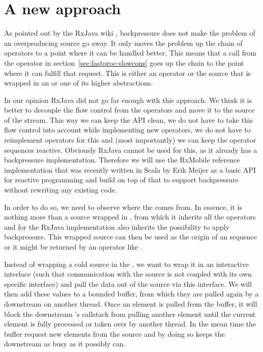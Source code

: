 \section{A new approach}
As pointed out by the RxJava wiki \cite{RxJava-Wiki-Backpressure}, backpressure does not make the problem of an overproducing source go away. It only moves the problem up the chain of operators to a point where it can be handled better. This means that a  call from the  operator in section~\ref{sec:fastproc-slowcons} goes up the chain to the point where it can fulfill that request. This is either an operator or the source that is wrapped in an  or one of its higher abstractions.

In our opinion RxJava did not go far enough with this approach. We think it is better to decouple the flow control from the operators and move it to the source of the stream. This way we can keep the API clean, we do not have to take this flow control into account while implementing new operators, we do not have to reimplement operators for this and (most importantly) we can keep the operator sequences reactive. Obviously RxJava cannot be used for this, as it already has a backpressure implementation. Therefore we will use the RxMobile \cite{RxMobile} reference implementation that was recently written in Scala by Erik Meijer as a basic API for reactive programming and build on top of that to support backpressure without rewriting any existing code.

In order to do so, we need to observe where the \obs comes from. In essence, it is nothing more than a source wrapped in , from which it inherits all the operators and for the RxJava implementation also inherits the possibility to apply backpressure. This wrapped source can then be used as the origin of an \obs sequence or it might be returned by an operator like .

Instead of wrapping a cold source in the , we want to wrap it in an interactive interface (such that communication with the source is not coupled with its own specific interface) and pull the data out of the source via this interface. We will then add these values to a bounded buffer, from which they are pulled again by a downstream \obs on another thread. Once an element is pulled from the buffer, it will block the downstream \obs's callstack from pulling another element until the current element is fully processed or taken over by another thread. In the mean time the buffer request new elements from the source and by doing so keeps the downstream \obs as busy as it possibly can.


